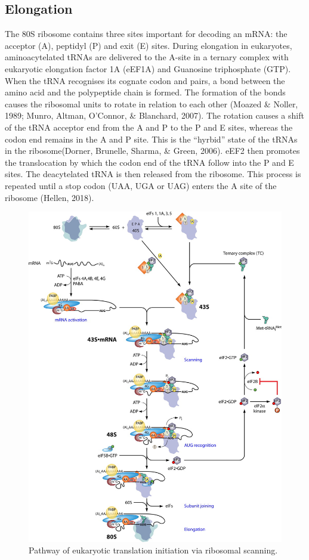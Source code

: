 \documentclass[
  12pt,
  openany]{book}
\begin{document}
\subsection{Elongation}

The 80S ribosome contains three sites important for decoding an mRNA: the acceptor (A), peptidyl (P) and exit (E) sites. During elongation in eukaryotes, aminoacytelated tRNAs are delivered to the A-site in a ternary complex with eukaryotic elongation factor 1A (eEF1A) and Guanosine triphosphate (GTP). When the tRNA recognises its cognate codon and pairs, a bond between the amino acid and the polypeptide chain is formed. The formation of the bonds causes the ribosomal units to rotate in relation to each other (Moazed \& Noller, 1989; Munro, Altman, O'Connor, \& Blanchard, 2007). The rotation causes a shift of the tRNA acceptor end from the A and P to the P and E sites, whereas the codon end remains in the A and P site. This is the ``hyrbid'' state of the tRNAs in the ribosome(Dorner, Brunelle, Sharma, \& Green, 2006). eEF2 then promotes the translocation by which the codon end of the tRNA follow into the P and E sites. The deacytelated tRNA is then released from the ribosome. This process is repeated until a stop codon (UAA, UGA or UAG) enters the A site of the ribosome (Hellen, 2018).

\begin{figure}[ht]
\includegraphics{./figures/initiation.jpg} 
  \caption{Pathway of eukaryotic translation initiation via ribosomal scanning.
  \label{fig:initiation}}
\end{figure}
\end{document}
